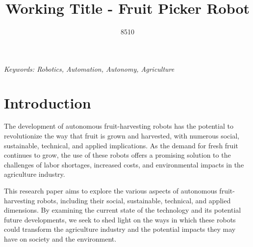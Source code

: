 \documentclass{modelica}
\begin{document}
\thispagestyle{empty}

\title{Working Title - Fruit Picker Robot} %
\author[1]{8510}


\maketitle\thispagestyle{empty} %

\noindent\emph{Keywords: Robotics, Automation, Autonomy, Agriculture}

\section{Introduction}
The development of autonomous fruit-harvesting robots has the potential to revolutionize the way that fruit is grown and harvested, with numerous social, sustainable, technical, and applied implications. As the demand for fresh fruit continues to grow, the use of these robots offers a promising solution to the challenges of labor shortages, increased costs, and environmental impacts in the agriculture industry.

This research paper aims to explore the various aspects of autonomous fruit-harvesting robots, including their social, sustainable, technical, and applied dimensions. By examining the current state of the technology and its potential future developments, we seek to shed light on the ways in which these robots could transform the agriculture industry and the potential impacts they may have on society and the environment.
\end{document}
